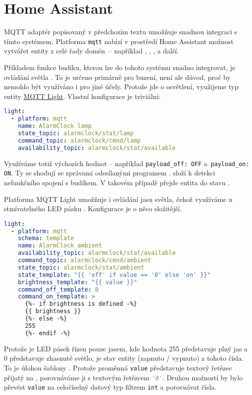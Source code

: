 \section{Home Assistant}




MQTT adaptér  popisovaný v předchozím textu
umožňuje snadnou integraci s tímto systémem. Platforma \texttt{mqtt} nabízí
v prostředí Home Assistant možnost vytvářet entity z celé řady domén~--
například , , ,
 a další.

Příkladem funkce budíku, kterou lze do tohoto systému snadno integrovat, je
ovládání světla . To je určeno primárně pro buzení, není ale důvod,
proč by nemohlo být využíváno i pro jiné účely. Protože jde o osvětlení,
využijeme typ entity
\href{https://www.home-assistant.io/integrations/light.mqtt}{MQTT Light}.
Vlastní konfigurace je triviální:
\begin{lstlisting}[language=yaml]
light:
  - platform: mqtt
    name: AlarmClock lamp
    state_topic: alarmclock/stat/lamp
    command_topic: alarmclock/cmnd/lamp
    availability_topic: alarmclock/stat/available
\end{lstlisting}
Využíváme totiž výchozích hodnot -- například \lstinline!payload_off: OFF!
a~\lstinline!payload_on: ON!. Ty se shodují se zprávami odesílanými programem
.  složí k detekci
nefunkčního spojení s budíkem. V takovém případě přejde entita
 do stavu .

Platforma MQTT Light umožňuje i ovládání jasu světla, čehož využíváme
u stmívatelného LED pásku . Konfigurace je o něco složitější.
\begin{lstlisting}[language=yaml]
light:
  - platform: mqtt
    schema: template
    name: AlarmClock ambient
    availability_topic: alarmclock/stat/available
    command_topic: alarmclock/cmnd/ambient
    state_topic: alarmclock/stat/ambient
    state_template: "{{ 'off' if value == '0' else 'on' }}"
    brightness_template: "{{ value }}"
    command_off_template: 0
    command_on_template: >
      {%- if brightness is defined -%}
      {{ brightness }}
      {%- else -%}
      255
      {%- endif -%}
\end{lstlisting}
Protože je LED pásek řízen pouze jasem, kde hodnota \num{255} představuje plný
jas a \num{0} představuje zhasnuté světlo, je stav entity (zapnuto / vypnuto)
z tohoto čísla. To je úlohou šablony . Protože proměnná
\texttt{value} představuje textový řetězec přijatý na ,
porovnáváme ji s textovým řetězcem \lstinline[language=Python]!'0'!. Druhou
možností by bylo převést \texttt{value} na celočíselný datový typ filtrem
\texttt{int} a porovnávat čísla.

